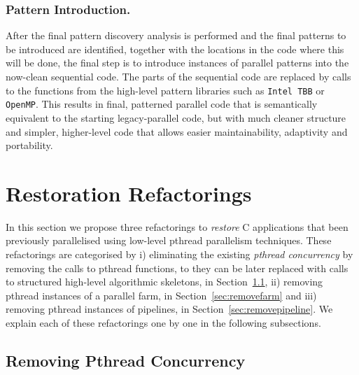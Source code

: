 \subsubsection{Pattern Introduction.}
After the final pattern discovery analysis is performed and the final patterns to be introduced are identified, together with the locations in the code where this will be done, the final step is to introduce instances of parallel patterns into the now-clean sequential code. The parts of the sequential code are replaced by calls to the functions from the high-level pattern libraries such as \lstinline{Intel TBB} or \lstinline{OpenMP}. This results in final, patterned parallel code that is semantically equivalent to the starting legacy-parallel code, but with much cleaner structure and simpler, higher-level code that allows easier maintainability, adaptivity and portability.

\section{Restoration Refactorings} 

In this section we propose three refactorings to \emph{restore} C applications that been previously parallelised using low-level pthread parallelism techniques.
These refactorings are categorised by i) eliminating the existing \emph{pthread concurrency} by removing the calls to pthread functions, to they can be later replaced with calls to structured high-level algorithmic skeletons, in Section~\ref{sec:removepthread}, ii) removing pthread instances of a parallel farm, in Section~\ref{sec:removefarm} and iii) removing pthread instances of pipelines, in Section~\ref{sec:removepipeline}. We explain each of these refactorings one by one in the following subsections.

\subsection{Removing Pthread Concurrency} \label{sec:removepthread}



